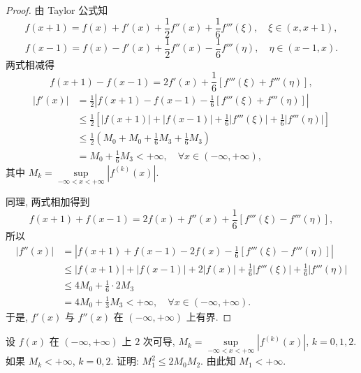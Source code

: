 \begin{proof}
由 Taylor 公式知
\[
f(x+1)=f(x)+f'(x)+\frac{1}{2}f''(x)+\frac{1}{6}f'''(\xi),\quad \xi\in(x,x+1),
\]
\[
f(x-1)=f(x)-f'(x)+\frac{1}{2}f''(x)-\frac{1}{6}f'''(\eta),\quad \eta\in(x-1,x).
\]
两式相减得
\[
f(x+1)-f(x-1)=2f'(x)+\frac{1}{6}[f'''(\xi)+f'''(\eta)],
\]
\begin{align*}
|f'(x)|&=\frac{1}{2}\left|f(x+1)-f(x-1)-\frac{1}{6}[f'''(\xi)+f'''(\eta)]\right|\\
&\leqslant\frac{1}{2}\left[|f(x+1)|+|f(x-1)|+\frac{1}{6}|f'''(\xi)|+\frac{1}{6}|f'''(\eta)|\right]\\
&\leqslant\frac{1}{2}\left(M_{0}+M_{0}+\frac{1}{6}M_{3}+\frac{1}{6}M_{3}\right)\\
&=M_{0}+\frac{1}{6}M_{3}<+\infty,\quad \forall x\in(-\infty,+\infty),
\end{align*}
其中 $M_{k}=\sup\limits_{-\infty<x<+\infty}|f^{(k)}(x)|$.

同理, 两式相加得到
\[
f(x+1)+f(x-1)=2f(x)+f''(x)+\frac{1}{6}[f'''(\xi)-f'''(\eta)],
\]
所以
\begin{align*}
|f''(x)|&=\left|f(x+1)+f(x-1)-2f(x)-\frac{1}{6}[f'''(\xi)-f'''(\eta)]\right|\\
&\leqslant |f(x+1)|+|f(x-1)|+2|f(x)|+\frac{1}{6}|f'''(\xi)|+\frac{1}{6}|f'''(\eta)|\\
&\leqslant 4M_{0}+\frac{1}{6}\cdot 2M_{3}\\
&=4M_{0}+\frac{1}{3}M_{3}<+\infty,\quad \forall x\in(-\infty,+\infty).
\end{align*}
于是, $f'(x)$ 与 $f''(x)$ 在 $(-\infty,+\infty)$ 上有界.
\end{proof}

\begin{example}\label{ex:4.1.16}
设 $f(x)$ 在 $(-\infty,+\infty)$ 上 $2$ 次可导, $M_{k}=\sup\limits_{-\infty<x<+\infty}|f^{(k)}(x)|$, $k=0,1,2$. 如果 $M_{k}<+\infty$, $k=0,2$. 证明: $M_{1}^{2}\leqslant 2M_{0}M_{2}$. 由此知 $M_{1}<+\infty$.
\end{example}

